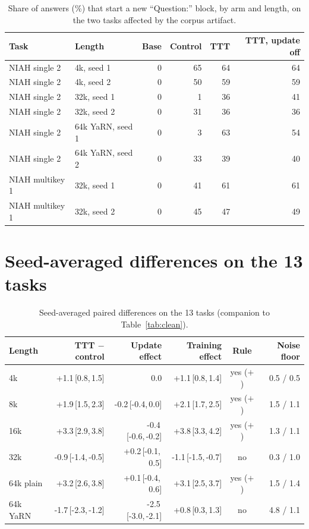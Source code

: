 \documentclass{article}
\newcommand{\ci}[3]{#1\,[#2,\,#3]}
\begin{document}
\begin{table}[H]
\caption{Share of answers (\%) that start a new ``Question:'' block, by arm and length, on the two tasks affected by the corpus artifact.}
\label{tab:failure}
\centering
\footnotesize
\begin{tabular}{llrrrr}
\toprule
Task & Length & Base & Control & TTT & TTT, update off \\
\midrule
NIAH single 2 & 4k, seed 1 & 0 & 65 & 64 & 64 \\
NIAH single 2 & 4k, seed 2 & 0 & 50 & 59 & 59 \\
NIAH single 2 & 32k, seed 1 & 0 & 1 & 36 & 41 \\
NIAH single 2 & 32k, seed 2 & 0 & 31 & 36 & 36 \\
NIAH single 2 & 64k YaRN, seed 1 & 0 & 3 & 63 & 54 \\
NIAH single 2 & 64k YaRN, seed 2 & 0 & 33 & 39 & 40 \\
NIAH multikey 1 & 32k, seed 1 & 0 & 41 & 61 & 61 \\
NIAH multikey 1 & 32k, seed 2 & 0 & 45 & 47 & 49 \\
\bottomrule
\end{tabular}
\end{table}

\section{Seed-averaged differences on the 13 tasks}\label{app:pooled}

\begin{table}[H]
\caption{Seed-averaged paired differences on the 13 tasks (companion to Table~\ref{tab:clean}).}
\label{tab:pooled13}
\centering
\footnotesize
\begin{tabular}{lrrrcr}
\toprule
Length & TTT $-$ control & Update effect & Training effect & Rule & Noise floor \\
\midrule
4k & \ci{+1.1}{0.8}{1.5} & 0.0 & \ci{+1.1}{0.8}{1.4} & yes ($+$) & 0.5 / 0.5 \\
8k & \ci{+1.9}{1.5}{2.3} & \ci{-0.2}{-0.4}{0.0} & \ci{+2.1}{1.7}{2.5} & yes ($+$) & 1.5 / 1.1 \\
16k & \ci{+3.3}{2.9}{3.8} & \ci{-0.4}{-0.6}{-0.2} & \ci{+3.8}{3.3}{4.2} & yes ($+$) & 1.3 / 1.1 \\
32k & \ci{-0.9}{-1.4}{-0.5} & \ci{+0.2}{-0.1}{0.5} & \ci{-1.1}{-1.5}{-0.7} & no & 0.3 / 1.0 \\
64k plain & \ci{+3.2}{2.6}{3.8} & \ci{+0.1}{-0.4}{0.6} & \ci{+3.1}{2.5}{3.7} & yes ($+$) & 1.5 / 1.4 \\
64k YaRN & \ci{-1.7}{-2.3}{-1.2} & \ci{-2.5}{-3.0}{-2.1} & \ci{+0.8}{0.3}{1.3} & no & 4.8 / 1.1 \\
\bottomrule
\end{tabular}
\end{table}
\end{document}
